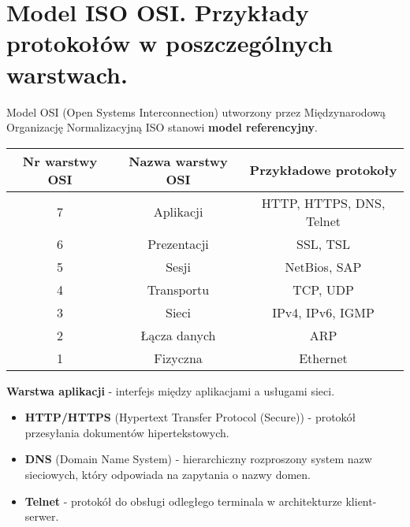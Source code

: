 \documentclass[main.tex]{subfiles}
\begin{document}
    \newpage

    \section{Model ISO OSI. Przykłady protokołów w poszczególnych warstwach.}
    Model OSI (Open Systems Interconnection) utworzony przez Międzynarodową Organizację Normalizacyjną ISO stanowi
    \textbf{model referencyjny}.

    \begin{table}[H]
        \begin{center}
            \begin{tabular}{|c|c|c| }
                \hline
                \textbf{Nr warstwy OSI} & \textbf{Nazwa warstwy OSI} & \textbf{Przykładowe protokoły}\\
                \hline
                \hline
                7 & Aplikacji & HTTP, HTTPS, DNS, Telnet\\
                \hline
                6 & Prezentacji & SSL, TSL\\
                \hline
                5 & Sesji & NetBios, SAP\\
                \hline
                4 & Transportu & TCP, UDP\\
                \hline
                3 & Sieci & IPv4, IPv6, IGMP\\
                \hline
                2 & Łącza danych & ARP\\
                \hline
                1 & Fizyczna & Ethernet\\
                \hline
            \end{tabular}
        \end{center}
    \end{table}

    \noindent \textbf{Warstwa aplikacji} - interfejs między aplikacjami a
    usługami sieci.
    \begin{itemize}
        \item \textbf{HTTP/HTTPS} (Hypertext Transfer Protocol (Secure)) - protokół przesyłania dokumentów hipertekstowych.
        \item \textbf{DNS} (Domain Name System) - hierarchiczny rozproszony system nazw sieciowych, który odpowiada na zapytania
        o nazwy domen.
        \item \textbf{Telnet} - protokół do obsługi odległego terminala w architekturze klient-serwer.
    \end{itemize}
\end{document}
